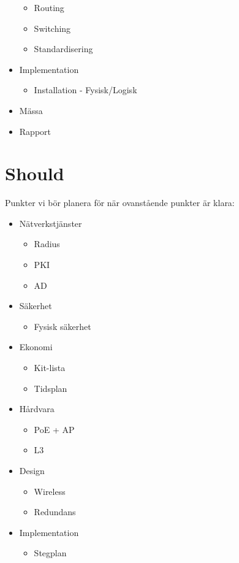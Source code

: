 \begin{itemize}[noitemsep]
    \begin{itemize}[noitemsep]
        \item Routing
        \item Switching
        \item Standardisering
    \end{itemize}
    \item Implementation
    \begin{itemize}[noitemsep]
        \item Installation - Fysisk/Logisk
    \end{itemize}
    \item Mässa
    \item Rapport
\end{itemize}

\section*{Should}
Punkter vi bör planera för när ovanstående punkter är klara:

\begin{itemize}[noitemsep]
    \item Nätverkstjänster
    \begin{itemize}
        \item Radius
        \item PKI
        \item AD
    \end{itemize}
    \item Säkerhet
    \begin{itemize}[noitemsep]
        \item Fysisk säkerhet
    \end{itemize}
    \item Ekonomi
    \begin{itemize}[noitemsep]
        \item Kit-lista
        \item Tidsplan
    \end{itemize}
    \item Hårdvara
    \begin{itemize}[noitemsep]
        \item PoE + AP
        \item L3
    \end{itemize}
    \item Design
    \begin{itemize}[noitemsep]
        \item Wireless
        \item Redundans
    \end{itemize}
    \item Implementation
    \begin{itemize}[noitemsep]
        \item Stegplan
    \end{itemize}
\end{itemize}

